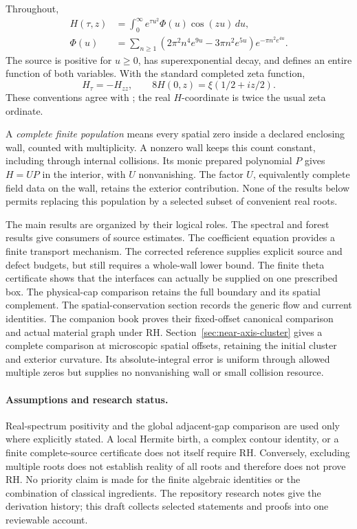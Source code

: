 \documentclass[11pt]{article}
\theoremstyle{remark}
\begin{document}
Throughout,
\begin{align}
H(\tau,z)&=\int_0^\infty e^{\tau u^2}\Phi(u)\cos(zu)\,du,
\label{eq:canonical}\\
\Phi(u)&=\sum_{n\ge1}
 (2\pi^2n^4e^{9u}-3\pi n^2e^{5u})e^{-\pi n^2e^{4u}}.
\nonumber
\end{align}
The source is positive for \(u\ge0\), has superexponential decay, and defines
an entire function of both variables. With the standard completed zeta
function,
\begin{equation}
 H_\tau=-H_{zz},\qquad 8H(0,z)=\xi(1/2+iz/2).
 \label{eq:normalization}
\end{equation}
These conventions agree with \cite{polymath,rodgers-tao}; the real
\(H\)-coordinate is twice the usual zeta ordinate.

A \emph{complete finite population} means every spatial zero inside a
declared enclosing wall, counted with multiplicity. A nonzero wall keeps
this count constant, including through internal collisions. Its monic
prepared polynomial \(P\) gives \(H=UP\) in the interior, with \(U\)
nonvanishing. The factor \(U\), equivalently complete field data on the
wall, retains the exterior contribution. None of the results below
permits replacing this population by a selected subset of convenient
real roots.

The main results are organized by their logical roles.
The spectral and forest results give consumers of source estimates.
The coefficient equation provides a finite transport mechanism.
The corrected reference supplies explicit source and defect budgets,
but still requires a whole-wall lower bound. The finite theta certificate
shows that the interfaces can actually be supplied on one prescribed
box. The physical-cap comparison retains the full boundary and its
spatial complement. The spatial-conservation section records the generic
flow and current identities. The companion book \cite[Theorems 1.1 and
3.1]{book-contours} proves their fixed-offset canonical comparison and
actual material graph under RH. Section~\ref{sec:near-axis-cluster} gives
a complete comparison at microscopic spatial offsets, retaining the
initial cluster and exterior curvature. Its absolute-integral error is
uniform through allowed multiple zeros but supplies no nonvanishing
wall or small collision resource.

\paragraph{Assumptions and research status.}
Real-spectrum positivity and the global adjacent-gap comparison are used
only where explicitly stated. A local Hermite birth, a complex contour
identity, or a finite complete-source certificate does not itself require
RH. Conversely, excluding multiple roots does not establish reality of
all roots and therefore does not prove RH.
No priority claim is made for the finite algebraic identities or the
combination of classical ingredients. The repository research notes give
the derivation history; this draft collects selected statements and
proofs into one reviewable account.
\end{document}
